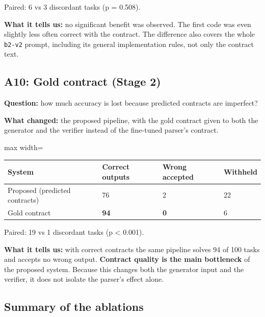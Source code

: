 \documentclass[11pt]{article}
\begin{document}
Paired: 6 vs 3 discordant tasks (p = 0.508).

\textbf{What it tells us:} no significant benefit was observed. The
first code was even slightly less often correct with the contract. The
difference also covers the whole \texttt{b2-v2} prompt, including its
general implementation rules, not only the contract text.

\subsection{A10: Gold contract (Stage 2)}

\textbf{Question:} how much accuracy is lost because predicted contracts
are imperfect?

\textbf{What changed:} the proposed pipeline, with the gold contract
given to both the generator and the verifier instead of the fine-tuned
parser's contract.

\begin{table}[!tp]
\centering\footnotesize\setlength{\tabcolsep}{3pt}\renewcommand{\arraystretch}{1.1}
\begin{adjustbox}{max width=\textwidth}\begin{tabular}{llll}
\toprule
\textbf{System} & \textbf{Correct outputs} & \textbf{Wrong accepted} & \textbf{Withheld} \\
\midrule
Proposed (predicted contracts) & 76 & 2 & 22 \\
Gold contract & \textbf{94} & \textbf{0} & 6 \\
\bottomrule
\end{tabular}\end{adjustbox}
\end{table}

Paired: 19 vs 1 discordant tasks (p \textless{} 0.001).

\textbf{What it tells us:} with correct contracts the same pipeline
solves 94 of 100 tasks and accepts no wrong output. \textbf{Contract
quality is the main bottleneck} of the proposed system. Because this
changes both the generator input and the verifier, it does not isolate
the parser's effect alone.

\subsection{Summary of the ablations}
\end{document}
